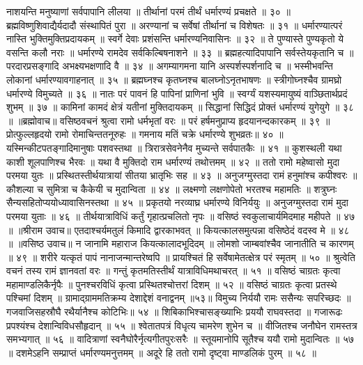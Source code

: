नाशयन्ति मनुष्याणां सर्वपापानि लीलया ॥
तीर्थानां परमं तीर्थं धर्मारण्यं प्रचक्षते ॥ ३० ॥
ब्रह्मविष्णुशिवाद्यैर्यदादौ संस्थापितं पुरा ॥
अरण्यानां च सर्वेषां तीर्थानां च विशेषतः ॥ ३१ ॥
धर्मारण्यात्परं नास्ति भुक्तिमुक्तिप्रदायकम् ॥
स्वर्गे देवाः प्रशंसन्ति धर्मारण्यनिवासिनः ॥ ३२ ॥
ते पुण्यास्ते पुण्यकृतो ये वसन्ति कलौ नराः ॥
धर्मारण्ये रामदेव सर्वकिल्बिषनाशने ॥ ३३ ॥
ब्रह्महत्यादिपापानि सर्वस्तेयकृतानि च ॥
परदारप्रसङ्गादि अभक्ष्यभक्षणादि वै ॥ ३४ ॥
अगम्यागमना यानि अस्पर्शस्पर्शनादि च ॥
भस्मीभवन्ति लोकानां धर्मारण्यावगाहनात् ॥ ३५ ॥
ब्रह्मघ्नश्च कृतघ्नश्च बालघ्नोऽनृतभाषणः ॥
स्त्रीगोघ्नश्चैव ग्रामघ्रो धर्मारण्ये विमुच्यते ॥ ३६ ॥
नातः परं पावनं हि पापिनां प्राणिनां भुवि ॥
स्वर्ग्यं यशस्यमायुष्यं वाञ्छितार्थप्रदं शुभम् ॥ ३७ ॥
कामिनां कामदं क्षेत्रं यतीनां मुक्तिदायकम् ॥
सिद्धानां सिद्धिदं प्रोक्तं धर्मारण्यं युगेयुगे ॥ ३८ ॥
॥ब्रह्मोवाच॥
वसिष्ठवचनं श्रुत्वा रामो धर्मभृतां वरः ॥
परं हर्षमनुप्राप्य हृदयानन्दकारकम् ॥ ३९ ॥
प्रोत्फुल्लहृदयो रामो रोमाचिन्ततनूरुहः ॥
गमनाय मतिं चक्रे धर्मारण्ये शुभव्रतः॥ ४० ॥
यस्मिन्कीटपतङ्गादिमानुषाः पशवस्तथा ॥
त्रिरात्रसेवनेनैव मुच्यन्ते सर्वपातकैः ॥ ४१ ॥
कुशस्थली यथा काशी शूलपाणिश्च भैरवः ॥
यथा वै मुक्तिदो राम धर्मारण्यं तथोत्तमम् ॥ ४२ ॥
ततो रामो महेष्वासो मुदा परमया युतः ॥
प्रस्थितस्तीर्थयात्रायां सीतया भ्रातृभिः सह ॥ ४३ ॥
अनुजग्मुस्तदा रामं हनुमांश्च कपीश्वरः ॥
कौशल्या च सुमित्रा च कैकेयी च मुदान्विता ॥ ४४ ॥
लक्ष्मणो लक्षणोपेतो भरतश्च महामतिः ॥
शत्रुघ्नः सैन्यसहितोप्ययोध्यावासिनस्तथा ॥ ४५ ॥
प्रकृतयो नरव्याघ्र धर्मारण्ये विनिर्ययुः ॥
अनुजग्मुस्तदा रामं मुदा परमया युताः ॥ ४६ ॥
तीर्थयात्राविधिं कर्तुं गृहात्प्रचलितो नृपः ॥
वसिष्ठं स्वकुलाचार्यमिदमाह महीपते ॥ ४७ ॥
॥श्रीराम उवाच॥
एतदाश्चर्यमतुलं किमादि द्वारकाभवत् ॥
कियत्कालसमुत्पन्ना वसिष्ठेदं वदस्व मे ॥ ४८ ॥
॥वसिष्ठ उवाच॥
न जानामि महाराज कियत्कालादभूदिदम् ॥
लोमशो जाम्बवांश्चैव जानातीति च कारणम् ॥ ४९ ॥
शरीरे यत्कृतं पापं नानाजन्मान्तरेष्वपि ॥
प्रायश्चितं हि सर्वेषामेतत्क्षेत्र परं स्मृतम् ॥ ५० ॥
श्रुत्वेति वचनं तस्य रामं ज्ञानवतां वरः ॥
गन्तुं कृतमतिस्तीर्थं यात्राविधिमथाचरत् ॥ ५१ ॥
वसिष्ठं चाग्रतः कृत्वा महामाण्डलिकैर्नृपैः ॥
पुनश्चरविधिं कृत्वा प्रस्थितश्चोत्तरां दिशम् ॥ ५२ ॥
वसिष्ठं चाग्रतः कृत्वा प्रतस्थे पश्चिमां दिशम् ॥
ग्रामाद्ग्राममतिक्रम्य देशाद्देशं वनाद्वनम् ॥५३॥
विमुच्य निर्ययौ रामः ससैन्यः सपरिच्छदः ॥
गजवाजिसहस्रौघै रथैर्यानैश्च कोटिभिः॥ ५४ ॥
शिबिकाभिश्चासङ्ख्याभिः प्रययौ राघवस्तदा ॥
गजारूढः प्रपश्यंश्च देशान्विविधसौहृदान् ॥ ५५ ॥
श्वेतातपत्रं विधृत्य चामरेण शुभेन च ॥
वीजितश्च जनौघेन रामस्तत्र समभ्यगात् ॥ ५६ ॥
वादित्राणां स्वनैघोरैर्नृत्यगीतपुरःसरैः ॥
स्तूयमानोपि सूतैश्च ययौ रामो मुदान्वितः ॥ ५७ ॥
दशमेऽहनि सम्प्राप्तं धर्मारण्यमनुत्तमम् ॥
अदूरे हि ततो रामो दृष्ट्वा माण्डलिकं पुरम् ॥ ५८ ॥
